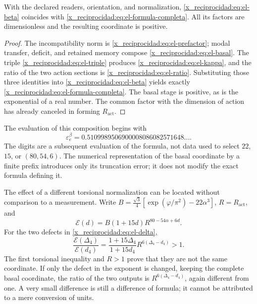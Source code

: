 \begin{theorem}
With the declared readers, orientation, and normalization,
\eqref{x_reciprocidad:eq:el-beta} coincides with \eqref{x_reciprocidad:eq:el-formula-completa}. All
its factors are dimensionless and the resulting coordinate is positive.
\end{theorem}
\begin{proof}
The incompatibility norm is \eqref{x_reciprocidad:eq:el-prefactor}; modal transfer,
deficit, and retained memory compose \eqref{x_reciprocidad:eq:el-basal}. The
triple \eqref{x_reciprocidad:eq:el-triple} produces \eqref{x_reciprocidad:eq:el-kappa}, and the ratio of
the two action sections is \eqref{x_reciprocidad:eq:el-ratio}. Substituting those
three identities into \eqref{x_reciprocidad:eq:el-beta} yields exactly
\eqref{x_reciprocidad:eq:el-formula-completa}. The basal stage is positive, as is the
exponential of a real number. The common factor with the dimension of
action has already canceled in forming \(R_{\mathrm{act}}\).
\end{proof}

The evaluation of this composition begins with
\begin{equation}
 \varepsilon_e^\beta
 =0.5109989506900008086082571648\ldots.
 \label{x_reciprocidad:eq:el-beta-decimal}
\end{equation}
The digits are a subsequent evaluation of the formula, not data used
to select \(22\), \(15\), or \((80,54,6)\). The numerical
representation of the basal coordinate by a finite prefix introduces only its
truncation error; it does not modify the exact formula defining it.

The effect of a different torsional normalization can be located
without comparison to a measurement. Write
\(B=\frac{\sqrt3}{4}[\exp(\varphi/\pi^2)-22\alpha^3]\),
\(R=R_{\mathrm{act}}\), and
\[
 \mathcal E(d)=B(1+15d)R^{80-54\alpha+6d}.
\]
For the two defects in \eqref{x_reciprocidad:eq:el-delta},
\begin{equation}
 \frac{\mathcal E(\Delta_4)}{\mathcal E(d_4)}
 =\frac{1+15\Delta_4}{1+15d_4}
   R^{6(\Delta_4-d_4)}>1.
 \label{x_reciprocidad:eq:el-normalizacion-beta}
\end{equation}
The first torsional inequality and \(R>1\) prove that they are not the same
coordinate. If only the defect in the exponent is changed, keeping the
complete basal coordinate, the ratio of the two outputs is
\(R^{6(\Delta_4-d_4)}\), again different from one. A very small
difference is still a difference of formula; it cannot be attributed to
a mere conversion of units.

